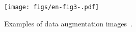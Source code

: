
\begin{figure}
    \centering
    \texttt{[image: figs/en-fig3-.pdf]}
    \caption{Examples of data augmentation images~\cite{PIXMIX,FractalDB,VisualAtom}.}
    \label{figMixImages}
\end{figure}



